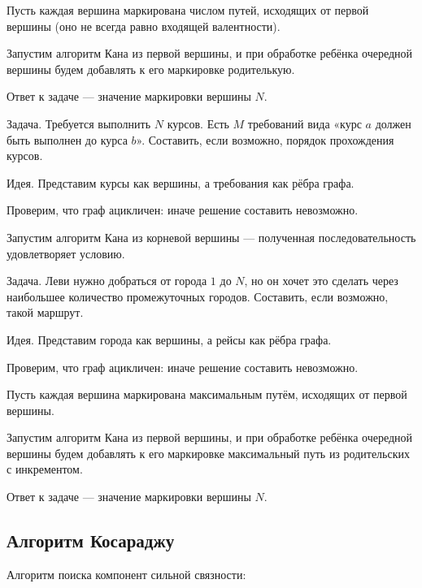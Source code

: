 Пусть каждая вершина маркирована числом путей, исходящих от первой вершины {\ital\color{desc}(оно не всегда равно входящей валентности)}.

Запустим алгоритм Кана из первой вершины, и при обработке ребёнка очередной вершины будем добавлять к его маркировке родителькую.

Ответ к задаче --- значение маркировки вершины $N$.

\begin{theorem}
{\bold Задача.} Требуется выполнить $N$ курсов. Есть $M$ требований вида {\ital «курс $a$ должен быть выполнен до курса $b$»}. Составить, если возможно, порядок прохождения курсов. 
\end{theorem}

{\bold Идея.} Представим курсы как вершины, а требования как рёбра графа.

Проверим, что граф {\ital ацикличен}: иначе решение составить невозможно.

Запустим алгоритм Кана из корневой вершины --- полученная последовательность удовлетворяет условию.

\begin{theorem}
{\bold Задача.} Леви нужно добраться от города $1$ до $N$, но он хочет это сделать через наибольшее количество промежуточных городов. Составить, если возможно, такой маршрут.
\end{theorem}

{\bold Идея.} Представим города как вершины, а рейсы как рёбра графа.

Проверим, что граф {\ital ацикличен}: иначе решение составить невозможно.

Пусть каждая вершина маркирована максимальным путём, исходящих от первой вершины.

Запустим алгоритм Кана из первой вершины, и при обработке ребёнка очередной вершины будем добавлять к его маркировке максимальный путь из родительских с инкрементом.

Ответ к задаче --- значение маркировки вершины $N$.

\subsection{Алгоритм Косараджу}

{\bold Алгоритм} поиска компонент сильной связности:


